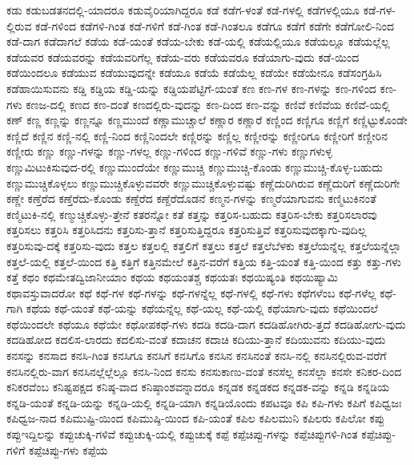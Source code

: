{ಕಡು
ಕಡುಬಡತನದಲ್ಲಿ-ಯಾದರೂ
ಕಡುವೈರಿಯಾಗಿದ್ದರೂ
ಕಡೆ
ಕಡೆಗ-ಳಂತೆ
ಕಡೆ-ಗಳಲ್ಲಿ
ಕಡೆಗಳಲ್ಲಿಯೂ
ಕಡೆ-ಗಳ-ಲ್ಲಿರುವ
ಕಡೆ-ಗಳಿಂದ
ಕಡೆಗಳಿ-ಗಿಂತ
ಕಡೆ-ಗಳಿಗೆ
ಕಡೆ-ಗಿಂತ
ಕಡೆ-ಗಿಂತಲೂ
ಕಡೆಗೂ
ಕಡೆಗೆ
ಕಡೆಗೇ
ಕಡೆಗೋಲಿ-ನಿಂದ
ಕಡೆ-ದಾಗ
ಕಡೆದಾಗಲೆ
ಕಡೆಯ
ಕಡೆ-ಯಂತೆ
ಕಡೆಯ-ಬೇಕು
ಕಡೆ-ಯಲ್ಲಿ
ಕಡೆಯಲ್ಲಿಯೂ
ಕಡೆಯಲ್ಲೂ
ಕಡೆಯಲ್ಲೆಲ್ಲ
ಕಡೆಯವರ
ಕಡೆಯವರನ್ನು
ಕಡೆಯವರಿಗೆಲ್ಲ
ಕಡೆಯ-ವರು
ಕಡೆಯವರೂ
ಕಡೆಯಾಗು-ವುದು
ಕಡೆ-ಯಿಂದ
ಕಡೆಯಿಂದಲೂ
ಕಡೆಯುವ
ಕಡೆಯುವುದನ್ನೇ
ಕಡೆಯೂ
ಕಡೆಯೆ
ಕಡೆಯೆಲ್ಲ
ಕಡೆಯೇ
ಕಡೆಯೇನೂ
ಕಡೆಸಂಗ್ರಹಿಸಿ
ಕಡೆಹಾಯಿಸುವನು
ಕಡ್ಡಿ
ಕಡ್ಡಿಯ
ಕಡ್ಡಿ-ಯನ್ನು
ಕಡ್ಡಿಯಪೆಟ್ಟಿಗೆ-ಯಂತೆ
ಕಣ
ಕಣ-ಗಳ
ಕಣ-ಗಳನ್ನು
ಕಣ-ಗಳಿಂದ
ಕಣ-ಗಳು
ಕಣಜ-ದಲ್ಲಿ
ಕಣದ
ಕಣ-ದಂತೆ
ಕಣದಲ್ಲಿರು-ವುದನ್ನು
ಕಣ-ದಿಂದ
ಕಣ-ವನ್ನು
ಕಣಿವೆ
ಕಣಿವೆಯ
ಕಣಿವೆ-ಯಲ್ಲಿ
ಕಣ್
ಕಣ್ಣ
ಕಣ್ಣನ್ನು
ಕಣ್ಣನ್ನೂ
ಕಣ್ಣಮುಂದೆ
ಕಣ್ಣಾಮುಚ್ಚಾಲೆ
ಕಣ್ಣಾರ
ಕಣ್ಣಾರೆ
ಕಣ್ಣಿಂದ
ಕಣ್ಣಿಗೂ
ಕಣ್ಣಿಗೆ
ಕಣ್ಣಿಟ್ಟುಕೊಂಡೇ
ಕಣ್ಣಿದೆ
ಕಣ್ಣಿನ
ಕಣ್ಣಿ-ನಲ್ಲಿ
ಕಣ್ಣಿ-ನಿಂದ
ಕಣ್ಣಿನಿಂದಲೇ
ಕಣ್ಣಿರನ್ನು
ಕಣ್ಣಿಲ್ಲ
ಕಣ್ಣೀರನ್ನು
ಕಣ್ಣೀರಿಗೂ
ಕಣ್ಣೀರಿಗೆ
ಕಣ್ಣೀರಿನ
ಕಣ್ಣೀರು
ಕಣ್ಣು
ಕಣ್ಣು-ಗಳನ್ನು
ಕಣ್ಣು-ಗಳಲ್ಲ
ಕಣ್ಣು-ಗಳಿಂದ
ಕಣ್ಣು-ಗಳಿವೆ
ಕಣ್ಣು-ಗಳು
ಕಣ್ಣುಗಳುಳ್ಳ
ಕಣ್ಣುಮಿಟುಕಿಸುವುದ-ರಲ್ಲಿ
ಕಣ್ಣುಮುಂದೆಯೇ
ಕಣ್ಣುಮುಚ್ಚಿ
ಕಣ್ಣುಮುಚ್ಚಿ-ಕೊಂಡು
ಕಣ್ಣುಮುಚ್ಚಿ-ಕೊಳ್ಳ-ಬಹುದು
ಕಣ್ಣುಮುಚ್ಚಿಕೊಳ್ಳಲು
ಕಣ್ಣುಮುಚ್ಚಿಕೊಳ್ಳುವವರೇ
ಕಣ್ಣುಮುಚ್ಚಿಕೊಳ್ಳುವಷ್ಟು
ಕಣ್ಣೆದುರಿಗಿರುವ
ಕಣ್ಣೆದುರಿಗೆ
ಕಣ್ಣೆದುರಿಗೇ
ಕಣ್ಣೇ
ಕಣ್ತೆರೆದ
ಕಣ್ತೆರೆದು-ಕೊಂಡು
ಕಣ್ದೆರೆದ
ಕಣ್ದೆರೆದೊಡನೆ
ಕಣ್ಮನ-ಗಳನ್ನು
ಕಣ್ಮರೆಯಾಗುವನು
ಕಣ್ಮಿಟುಕಿನಂತೆ
ಕಣ್ಮಿಟುಕಿ-ನಲ್ಲಿ
ಕಣ್ಮುಚ್ಚಿಕೊಳ್ಳು-ತ್ತೇನೆ
ಕತರನ್ನೋ
ಕತೆ
ಕತ್ತನ್ನು
ಕತ್ತರಿಸ-ಬಹುದು
ಕತ್ತರಿಸ-ಬೇಕು
ಕತ್ತರಿಸಲಾರವು
ಕತ್ತರಿಸಲು
ಕತ್ತರಿಸಿ
ಕತ್ತರಿಸಿದನು
ಕತ್ತರಿಸು-ತ್ತಾನೆ
ಕತ್ತರಿಸುತ್ತಿದ್ದರೂ
ಕತ್ತರಿಸುತ್ತಿವೆ
ಕತ್ತರಿಸುವುದಕ್ಕಾಗು-ವುದಿಲ್ಲ
ಕತ್ತರಿಸುವು-ದಕ್ಕೆ
ಕತ್ತರಿಸು-ವುದು
ಕತ್ತಲ
ಕತ್ತಲಲ್ಲಿ
ಕತ್ತಲಿಗೆ
ಕತ್ತಲು
ಕತ್ತಲೆ
ಕತ್ತಲೆಬೆಳಕು
ಕತ್ತಲೆಯನ್ನೆಲ್ಲ
ಕತ್ತಲೆಯನ್ನೆಲ್ಲಾ
ಕತ್ತಲೆ-ಯಲ್ಲಿ
ಕತ್ತಲೆ-ಯಿಂದ
ಕತ್ತಿ
ಕತ್ತಿಗೆ
ಕತ್ತಿನಮೇಲೆ
ಕತ್ತಿನ-ವರೆಗೆ
ಕತ್ತಿಯ
ಕತ್ತಿ-ಯಂತೆ
ಕತ್ತಿ-ಯಿಂದ
ಕತ್ತು
ಕತ್ತು-ಗಳು
ಕತ್ತೆ
ಕಥಂ
ಕಥಮೇತದ್ವಿಜಾನೀಯಾಂ
ಕಥಯ
ಕಥಯಂತಶ್ಚ
ಕಥಯತಃ
ಕಥಯಿಷ್ಯಂತಿ
ಕಥಯಿಷ್ಯಾಮಿ
ಕಥಾವಸ್ತುವಾದರೋ
ಕಥೆ
ಕಥೆ-ಗಳ
ಕಥೆ-ಗಳನ್ನು
ಕಥೆ-ಗಳನ್ನೆಲ್ಲ
ಕಥೆ-ಗಳಲ್ಲಿ
ಕಥೆ-ಗಳು
ಕಥೆಗಳೆಂಬ
ಕಥೆ-ಗಳೆಲ್ಲ
ಕಥೆ-ಗಾಗಿ
ಕಥೆಯ
ಕಥೆ-ಯಂತೆ
ಕಥೆ-ಯನ್ನು
ಕಥೆಯನ್ನೆಲ್ಲ
ಕಥೆ-ಯಲ್ಲ
ಕಥೆ-ಯಲ್ಲಿ
ಕಥೆಯಾಗು-ವುದು
ಕಥೆಯಿಂದಲೆ
ಕಥೆಯಿಂದಲೇ
ಕಥೆಯೂ
ಕಥೆಯೇ
ಕಥೋಪಕಥೆ-ಗಳು
ಕದಡಿ
ಕದಡಿ-ದಾಗ
ಕದಡಿಹೋಗಿರು-ತ್ತದೆ
ಕದಡಿಹೋಗು-ವುದು
ಕದಡಿಹೋದ
ಕದಲಿಸ-ಲಾರದು
ಕದಲಿಸು-ವಂತೆ
ಕದಾಚನ
ಕದಾಚಿ
ಕದಿಯು-ತ್ತಾನೆ
ಕದಿಯುವನು
ಕದಿಯು-ವುದು
ಕನಸನ್ನು
ಕನಸಾದ
ಕನಸಿ-ಗಿಂತ
ಕನಸಿಗೂ
ಕನಸಿಗೆ
ಕನಸಿಗೊ
ಕನಸಿನ
ಕನಸಿನಂತೆ
ಕನಸಿ-ನಲ್ಲಿ
ಕನಸಿನಲ್ಲಿರುವ-ವರೆಗೆ
ಕನಸಿನಲ್ಲಿರು-ವಾಗ
ಕನಸಿನಲ್ಲೆಲ್ಲೆಲ್ಲೂ
ಕನಸಿ-ನಿಂದ
ಕನಸು
ಕನಸುಕಾಣು-ವಂತೆ
ಕನಸೆಲ್ಲ
ಕನಸೆಲ್ಲಾ
ಕನಸೇ
ಕನಿಕರ-ದಿಂದ
ಕನಿಕರವೆಂಬ
ಕನಿಷ್ಟಪಕ್ಷದ
ಕನಿಷ್ಠ-ವಾದ
ಕನಿಷ್ಠಾಂಶವನ್ನಾದರೂ
ಕನ್ನಡಕ
ಕನ್ನಡಕದ
ಕನ್ನಡಕ-ವನ್ನು
ಕನ್ನಡಿ
ಕನ್ನಡಿಯ
ಕನ್ನಡಿ-ಯಂತೆ
ಕನ್ನಡಿ-ಯನ್ನು
ಕನ್ನಡಿ-ಯಲ್ಲಿ
ಕನ್ನಡಿ-ಯಾಗಿ
ಕನ್ನಡಿಯೊಂದು
ಕಪಟವೂ
ಕಪಿ
ಕಪಿ-ಗಳು
ಕಪಿಗೆ
ಕಪಿಧ್ವಜಃ
ಕಪಿಧ್ವಜ-ನಾದ
ಕಪಿಮುಷ್ಟಿ-ಯಿಂದ
ಕಪಿಮುಷ್ಠಿ-ಯಿಂದ
ಕಪಿ-ಯಂತೆ
ಕಪಿಲ
ಕಪಿಲಮುನಿ
ಕಪಿಲರು
ಕಪಿಲೋ
ಕಪ್ಪು
ಕಪ್ಪುಇದ್ದಿಲನ್ನು
ಕಪ್ಪುಚುಕ್ಕಿ-ಗಳಿವೆ
ಕಪ್ಪುಚುಕ್ಕಿ-ಯಲ್ಲಿ
ಕಪ್ಪುಚುಕ್ಕೆ
ಕಪ್ಪೆ
ಕಪ್ಪೆಚಿಪ್ಪು-ಗಳನ್ನು
ಕಪ್ಪೆಚಿಪ್ಪುಗಳಿ-ಗಿಂತ
ಕಪ್ಪೆಚಿಪ್ಪು-ಗಳಿಗೆ
ಕಪ್ಪೆಚಿಪ್ಪು-ಗಳು
ಕಪ್ಪೆಯ
}
